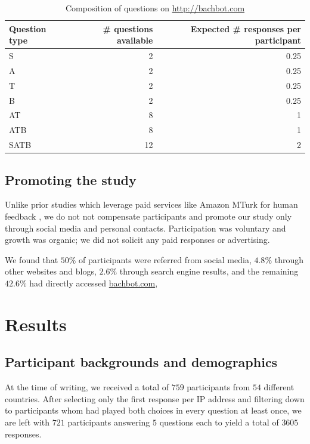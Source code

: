 \begin{table}[tb]
  \centering
  \begin{tabular}{lrr}
    \toprule
    Question type & \# questions available & Expected \# responses per participant \\
    \midrule
    S        & 2  & 0.25 \\
    A        & 2  & 0.25 \\
    T        & 2  & 0.25 \\
    B        & 2  & 0.25 \\
    AT       & 8  & 1 \\
    ATB      & 8  & 1 \\
    SATB     & 12 & 2 \\
    \bottomrule
  \end{tabular}
  \caption{Composition of questions on \url{http://bachbot.com}}
  \label{tab:bachbot-com-question-distribtion}
\end{table}

\subsection{Promoting the study}

Unlike prior studies which leverage paid services like Amazon MTurk for human
feedback \citep{quick2014kulitta}, we do not not compensate participants and
promote our study only through social media and personal contacts.
Participation was voluntary and growth was organic; we did not solicit any paid
responses or advertising.

We found that $50\%$ of participants were referred from social media, $4.8\%$
through other websites and blogs, $2.6\%$ through search engine results, and
the remaining $42.6\%$ had directly accessed \url{bachbot.com},

\section{Results}\label{sec:eval-results}

\subsection{Participant backgrounds and demographics}

At the time of writing, we received a total of $759$ participants from $54$
different countries. After selecting only the first response per IP address and
filtering down to participants whom had played both choices in every question
at least once, we are left with $721$ participants answering $5$ questions each
to yield a total of $3605$ responses.

